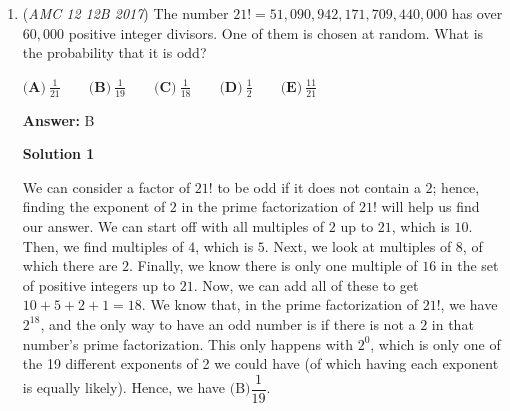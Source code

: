 \begin{enumerate}
First we note that $A'B'C'\sim ABC$ due to symmetry. WLOG, let $B = (0, 0)$ and $AB = 1$ Therefore, $C = (1, 0), A = \frac{1}{2}, \left(\frac{\sqrt{3}}{2}\right)$. Using the condition that $CC' = 3$, we get $C' = (4, 0)$ and $B' = \left(\frac{-3}{2}, \frac{-3\sqrt{3}}{2}\right)$. It is easy to check that $B'C' = \sqrt{37}$. Since the area ratios of two similar figures is the square of the ratio of their lengths, the ratio is $\boxed{\textbf{(E) } 37}$

 Solution by \textit{mathwiz0803}

 



\textbf{Solution 12: Computing the Areas}

Note that angle $C'BB'$ is $120$°, as it is supplementary to the equilateral triangle. Then, using area $= \frac{1}{2}ab\sin\theta$ and letting side $AB = 1$ for ease, we get: $4\cdot3\cdot\frac{\sin120}{2} = 3\sqrt{3}$ as the area of $C'BB'$. Then, the area of $ABC$ is $\frac{\sqrt{3}}{4}$, so the ratio is $\frac{3(3\sqrt{3})+\frac{\sqrt{3}}{4}}{\frac{\sqrt{3}}{4}} = \boxed{\textbf{(E) } 37}$

 Solution by Aadileo

 


	\item (\textit{AMC 12 12B 2017}) The number $21!=51,090,942,171,709,440,000$ has over $60,000$ positive integer divisors. One of them is chosen at random. What is the probability that it is odd?


 $\textbf{(A)}\ \frac{1}{21} \qquad \textbf{(B)}\ \frac{1}{19} \qquad \textbf{(C)}\ \frac{1}{18} \qquad \textbf{(D)}\ \frac{1}{2} \qquad \textbf{(E)}\ \frac{11}{21}$

 \textbf{Answer: }B



\textbf{Solution 1}

We can consider a factor of $21!$ to be odd if it does not contain a $2$; hence, finding the exponent of $2$ in the prime factorization of $21!$ will help us find our answer. We can start off with all multiples of $2$ up to $21$, which is $10$. Then, we find multiples of $4$, which is $5$. Next, we look at multiples of $8$, of which there are $2$. Finally, we know there is only one multiple of $16$ in the set of positive integers up to $21$. Now, we can add all of these to get $10+5+2+1=18$. We know that, in the prime factorization of $21!$, we have $2^{18}$, and the only way to have an odd number is if there is not a $2$ in that number's prime factorization. This only happens with $2^{0}$, which is only one of the 19 different exponents of 2 we could have (of which having each exponent is equally likely). Hence, we have  $\boxed{\text{(B)} \dfrac{1}{19}}.$


\end{enumerate}

